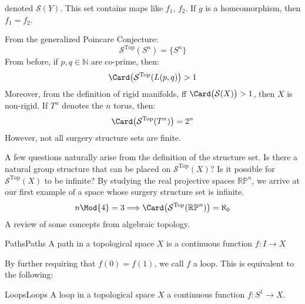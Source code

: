\documentclass[crop=false,class=book,oneside]{standalone}                      %
\begin{document}
            denoted $\mathcal{S}(Y)$. This set contains maps
            like $f_{1}$, $f_{2}$.
            If $g$ is a homeomorphism, then $f_{1}=f_{2}$.
            \begin{lexample}{}{}
                From the generalized Poincare Conjecture:
                \begin{equation}
                    \mathcal{S}^{\textrm{Top}}(S^{n})
                    =\{S^{n}\}
                \end{equation}
                From before, if $p,q\in\mathbb{N}$ are co-prime, then:
                \begin{equation}
                    \Card\big(\mathcal{S}^{\textrm{Top}}(L(p,q)\big)>1
                \end{equation}
                Moreover, from the definition of rigid manifolds,
                ff $\Card\big(\mathcal{S}(X)\big)>1$, then $X$ is non-rigid.
                If $T^{n}$ denotes the $n$ torus, then:
                \begin{equation}
                    \Card\big(\mathcal{S}^{\textrm{Top}}(T^{n})\big)
                    =2^{n}
                \end{equation}
                However, not all surgery structure sets are finite.
            \end{lexample}
            A few questions naturally arise from the
            definition of the structure set. Is there a natural group
            structure that can be placed on $\mathcal{S}^{\textrm{Top}}(X)$?
            Is it possible for $\mathcal{S}^{\textrm{Top}}(X)$ to be infinite?
            By studying the real projective spaces $\mathbb{RP}^{n}$, we
            arrive at our first example of a space whose surgery structure
            set is infinite.
            \begin{equation}
                n\Mod{4}=3
                \Longrightarrow
                \Card\big(\mathcal{S}^{\textrm{Top}}(\mathbb{RP}^{n})\big)
                =\aleph_{0}
            \end{equation}
            A review of some concepts from algebraic topology.
            \begin{ldefinition}{Paths}{Paths}
                A path in a topological space $X$ is a
                continuous function $f:I\rightarrow{X}$
            \end{ldefinition}
            By further requiring that $f(0)=f(1)$, we call $f$ a loop. This is
            equivalent to the following:
            \begin{ldefinition}{Loops}{Loops}
                A loop in a topological space $X$ a continuous function
                $f:S^{1}\rightarrow{X}$.
            \end{ldefinition}
\end{document}
